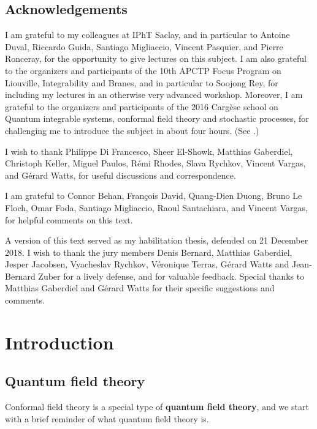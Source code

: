 \documentclass[12pt, a4paper, notitlepage, twoside]{report}
\numberwithin{equation}{section}
\theoremstyle{break}
\begin{document}
\section{Acknowledgements}

I am grateful to my colleagues at IPhT Saclay, and in particular to Antoine Duval, Riccardo Guida, Santiago Migliaccio, Vincent Pasquier, and Pierre Ronceray, for the opportunity to give lectures on this subject. I am also grateful to the organizers and participants of the 10th APCTP Focus Program on Liouville, Integrability and Branes, and in particular to Soojong Rey, for including my lectures in an otherwise very advanced workshop. Moreover, I am grateful to the organizers and participants of the 2016 Carg\`ese school on Quantum integrable systems, conformal field theory and stochastic processes, for challenging me to introduce the subject in about four hours. (See \cite{rib16}.) 

I wish to thank Philippe Di Francesco, Sheer El-Showk, Matthias Gaberdiel, Christoph Keller, Miguel Paulos, R\'emi Rhodes, Slava Rychkov, Vincent Vargas, and G\'erard Watts, for useful discussions and correspondence.

I am grateful to Connor Behan, Fran\c{c}ois David, Quang-Dien Duong, Bruno Le Floch, Omar Foda, Santiago Migliaccio, Raoul Santachiara, and Vincent Vargas, for helpful comments on this text.

A version of this text served as my habilitation thesis, defended on 21 December 2018. I wish to thank the jury members Denis Bernard, Matthias Gaberdiel, Jesper Jacobsen, Vyacheslav Rychkov, Véronique Terras, Gérard Watts and Jean-Bernard Zuber for a lively defense, and for valuable feedback. Special thanks to Matthias Gaberdiel and G\'erard Watts for their specific suggestions and comments.


\chapter{Introduction \label{secintr}}

\section{Quantum field theory \label{secqft} }

Conformal field theory is a special type of \textbf{\boldmath quantum field theory}, and we start with a brief reminder of what quantum field theory is.
\end{document}
